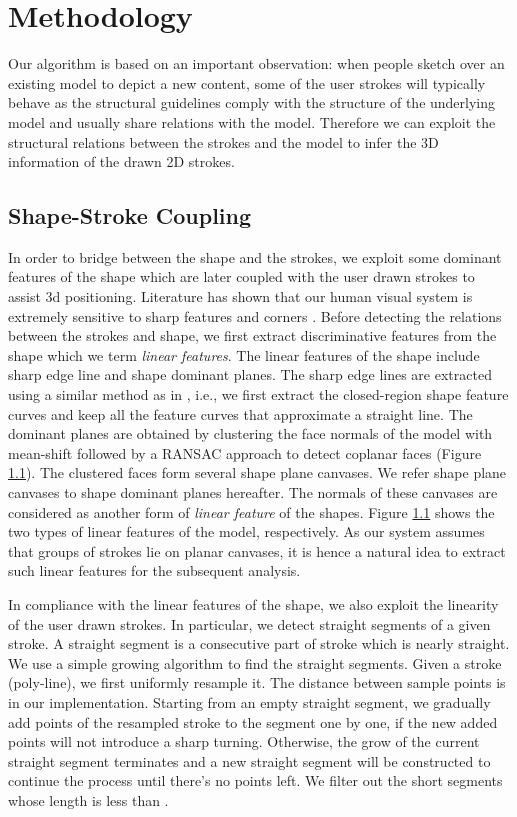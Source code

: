 \section{Methodology}

Our algorithm is based on an important observation: when people sketch over an existing model to depict a new content, some of the user strokes will typically behave as the structural guidelines comply with the structure of the underlying model and usually share relations with the model. Therefore we can exploit the structural relations between the strokes and the model to infer the 3{D} information of the drawn 2{D} strokes.


\subsection{Shape-Stroke Coupling}
In order to bridge between the shape and the strokes, we exploit some dominant features of the shape which are later coupled with the user drawn strokes to assist 3{d} positioning. Literature has shown that our human visual system is extremely sensitive to sharp features and corners \cite{line drawing}. Before detecting the relations between the strokes and shape, we first extract discriminative features from the shape which we term \emph{linear features}. The linear features of the shape include sharp edge line and shape dominant planes. The sharp edge lines are extracted using a similar method as in \ca{[Iwire]}, i.e., we first extract the closed-region shape feature curves and keep all the feature curves that approximate a straight line. The dominant planes are obtained by clustering the face normals of the model with mean-shift followed by a RANSAC approach to detect coplanar faces (Figure \ref{}). The clustered faces form several shape plane canvases. We refer shape plane canvases to shape dominant planes hereafter. The normals of these canvases are considered as another form of \emph{linear feature} of the shapes. Figure \ref{} shows the two types of linear features of the  model, respectively. As our system assumes that groups of strokes lie on planar canvases, it is hence a natural idea to extract such linear features for the subsequent analysis.

In compliance with the linear features of the shape, we also exploit the linearity of the user drawn strokes. In particular, we detect straight segments of a given stroke. A straight segment is a consecutive part of stroke which is nearly straight. We use a simple growing algorithm to find the straight segments. Given a stroke (poly-line), we first uniformly resample it. The distance between sample points is \ca{10px} in our implementation. Starting from an empty straight segment, we gradually add points of the resampled stroke to the segment one by one, if the new added points will not introduce a sharp turning. Otherwise, the grow of the current straight segment terminates and a new straight segment will be constructed to continue the process until there's no points left. We filter out the short segments whose length is less than \ca{50px}.

